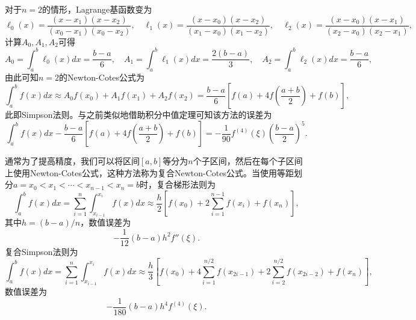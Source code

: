 \documentclass[a4paper,10pt]{ctexart}
\begin{document}
对于$ n=2 $的情形，Lagrange基函数变为
\[
    \ell_0(x) = \frac{(x-x_1)(x-x_2)}{(x_0-x_1)(x_0-x_2)},\quad \ell_1(x) = \frac{(x-x_0)(x-x_2)}{(x_1-x_0)(x_1-x_2)},\quad \ell_2(x) = \frac{(x-x_0)(x-x_1)}{(x_2-x_0)(x_2-x_1)},
\]
计算$ A_0,A_1,A_2 $可得
\[
    A_0 = \int_a^b \ell_0(x)dx = \frac{b-a}{6},\quad A_1 = \int_a^b \ell_1(x)dx = \frac{2(b-a)}{3},\quad A_2 = \int_a^b \ell_2(x)dx = \frac{b-a}{6},  
\]
由此可知$ n=2 $的Newton-Cotes公式为
\begin{equation}
    \int_a^b f(x)dx \approx A_0 f(x_0) + A_1 f(x_1) + A_2 f(x_2) = \frac{b-a}{6}\left[ f(a) + 4f\left(\frac{a+b}{2}\right) + f(b) \right],
\end{equation}
此即Simpson法则。与之前类似地借助积分中值定理可知该方法的误差为
\[
    \int_a^b f(x)dx - \frac{b-a}{6}\left[ f(a) + 4f\left(\frac{a+b}{2}\right) + f(b) \right] = -\frac{1}{90}f^{(4)}(\xi)(\frac{b-a}{2})^5.
\]

通常为了提高精度，我们可以将区间$ [a,b] $等分为$ n $个子区间，然后在每个子区间上使用Newton-Cotes公式，这种方法称为复合Newton-Cotes公式。当使用等距划分$ a = x_0< x_1<\cdots<x_{n-1} <x_n = b $时，复合梯形法则为
\begin{equation}
    \int_a^b f(x)dx = \sum_{i=1}^n \int_{x_{i-1}}^{x_i} f(x)dx \approx \frac{h}{2}\left[ f(x_0) + 2\sum_{i=1}^{n-1}f(x_i) + f(x_n) \right],
\end{equation}
其中$ h = (b-a)/n $，数值误差为
\[
    -\frac{1}{12} (b-a)h^2 f''(\xi).  
\]
复合Simpson法则为
\begin{equation}
    \int_a^b f(x)dx = \sum_{i=1}^n \int_{x_{i-1}}^{x_i} f(x)dx \approx \frac{h}{3}\left[ f(x_0) + 4\sum_{i=1}^{n / 2}f(x_{2i -1}) + 2\sum_{i=2}^{n / 2}f(x_{2i-2}) + f(x_n) \right],
\end{equation}
数值误差为
\[
    -\frac{1}{180} (b-a)h^4 f^{(4)}(\xi).
\]
\end{document}
